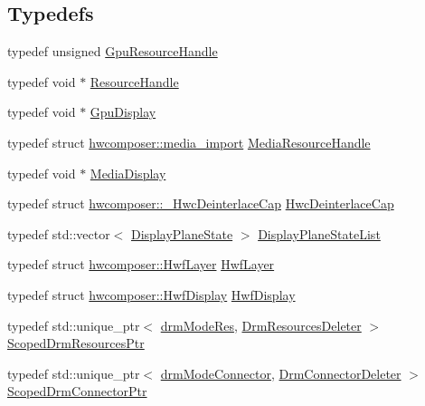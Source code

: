 \subsection*{Typedefs}
\begin{DoxyCompactItemize}
\item 
typedef unsigned \mbox{\hyperlink{namespacehwcomposer_a3da411c7c0213da2ce847c654bdc180d}{Gpu\+Resource\+Handle}}
\item 
typedef void $\ast$ \mbox{\hyperlink{namespacehwcomposer_a963c5a1d5902d2d05710dba19af35b48}{Resource\+Handle}}
\item 
typedef void $\ast$ \mbox{\hyperlink{namespacehwcomposer_ace90739a34de8ec5b30559423cdef990}{Gpu\+Display}}
\item 
typedef struct \mbox{\hyperlink{structhwcomposer_1_1media__import}{hwcomposer\+::media\+\_\+import}} \mbox{\hyperlink{namespacehwcomposer_aa99e35835961ac7d6baa59a04131ff42}{Media\+Resource\+Handle}}
\item 
typedef void $\ast$ \mbox{\hyperlink{namespacehwcomposer_a10d64930907cc775f9cea6b39d8cb404}{Media\+Display}}
\item 
typedef struct \mbox{\hyperlink{structhwcomposer_1_1__HwcDeinterlaceCap}{hwcomposer\+::\+\_\+\+Hwc\+Deinterlace\+Cap}} \mbox{\hyperlink{namespacehwcomposer_ae1b4391653ed2be718742b547c67e400}{Hwc\+Deinterlace\+Cap}}
\item 
typedef std\+::vector$<$ \mbox{\hyperlink{classhwcomposer_1_1DisplayPlaneState}{Display\+Plane\+State}} $>$ \mbox{\hyperlink{namespacehwcomposer_adf383ae435d39a5631a8ad82e7fa18a4}{Display\+Plane\+State\+List}}
\item 
typedef struct \mbox{\hyperlink{structhwcomposer_1_1HwfLayer}{hwcomposer\+::\+Hwf\+Layer}} \mbox{\hyperlink{namespacehwcomposer_a153bd861ad56f99f647093306b5d51ed}{Hwf\+Layer}}
\item 
typedef struct \mbox{\hyperlink{structhwcomposer_1_1HwfDisplay}{hwcomposer\+::\+Hwf\+Display}} \mbox{\hyperlink{namespacehwcomposer_a04bc26c3d4bbc34c05959dca8eaea1f4}{Hwf\+Display}}
\item 
typedef std\+::unique\+\_\+ptr$<$ \mbox{\hyperlink{drmscopedtypes_8h_a394774c7e66da001652fbd93d026b853}{drm\+Mode\+Res}}, \mbox{\hyperlink{structhwcomposer_1_1DrmResourcesDeleter}{Drm\+Resources\+Deleter}} $>$ \mbox{\hyperlink{namespacehwcomposer_a88e61b5e1ae620a5424a9497d554aea7}{Scoped\+Drm\+Resources\+Ptr}}
\item 
typedef std\+::unique\+\_\+ptr$<$ \mbox{\hyperlink{nativedisplay_8h_a16ea3fc6b16060fd1e1257707006440e}{drm\+Mode\+Connector}}, \mbox{\hyperlink{structhwcomposer_1_1DrmConnectorDeleter}{Drm\+Connector\+Deleter}} $>$ \mbox{\hyperlink{namespacehwcomposer_a6e831db409c69fed0af20a9cb29b50f1}{Scoped\+Drm\+Connector\+Ptr}}

\end{DoxyCompactItemize}
